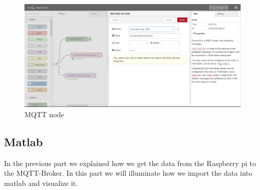\documentclass[12pt]{article}
\begin{document}
\begin{figure}[H]
	\includegraphics[width=\textwidth]{mqtt_node.PNG}
	\caption{MQTT node}
	\label{img:mqtt_node.PNG}
\end{figure}

\newpage

\subsection{Matlab}
In the previous part we explained how we get the data from the Raspberry pi to the MQTT-Broker. In this part we will illuminate how we import the data into matlab and visualize it.
\end{document}
